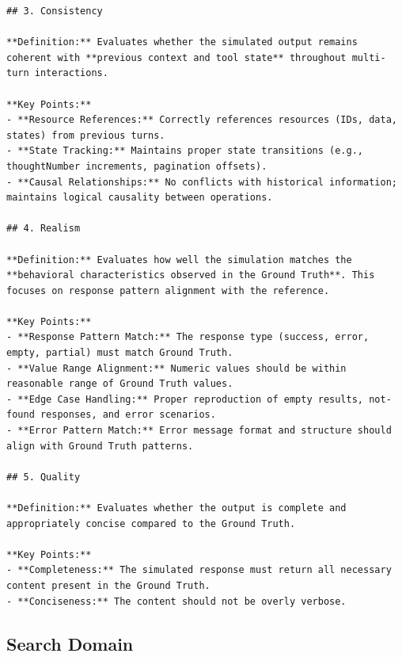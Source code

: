 \begin{lstlisting}
## 3. Consistency

**Definition:** Evaluates whether the simulated output remains coherent with **previous context and tool state** throughout multi-turn interactions.

**Key Points:**
- **Resource References:** Correctly references resources (IDs, data, states) from previous turns.
- **State Tracking:** Maintains proper state transitions (e.g., thoughtNumber increments, pagination offsets).
- **Causal Relationships:** No conflicts with historical information; maintains logical causality between operations.

## 4. Realism

**Definition:** Evaluates how well the simulation matches the **behavioral characteristics observed in the Ground Truth**. This focuses on response pattern alignment with the reference.

**Key Points:**
- **Response Pattern Match:** The response type (success, error, empty, partial) must match Ground Truth.
- **Value Range Alignment:** Numeric values should be within reasonable range of Ground Truth values.
- **Edge Case Handling:** Proper reproduction of empty results, not-found responses, and error scenarios.
- **Error Pattern Match:** Error message format and structure should align with Ground Truth patterns.

## 5. Quality

**Definition:** Evaluates whether the output is complete and appropriately concise compared to the Ground Truth.

**Key Points:**
- **Completeness:** The simulated response must return all necessary content present in the Ground Truth.
- **Conciseness:** The content should not be overly verbose.
\end{lstlisting}

\subsection{Search Domain}
\label{sec:appendix:judge_search}

